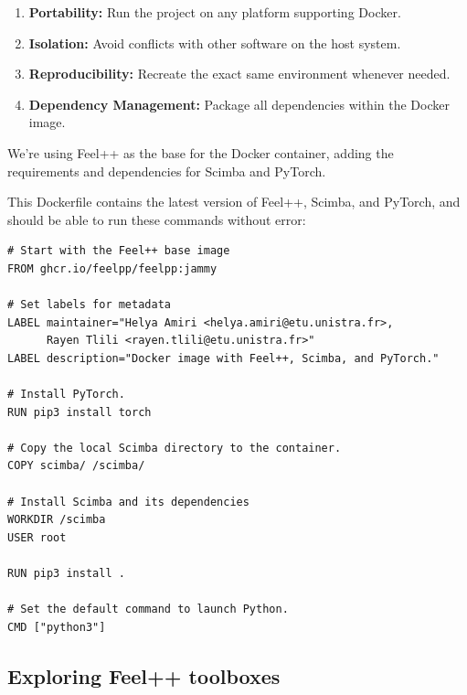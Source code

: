\documentclass[12pt]{article}
\begin{document}
\begin{enumerate}
    \item \textbf{Portability:} Run the project on any platform supporting Docker.
    \item \textbf{Isolation:} Avoid conflicts with other software on the host system.
    \item \textbf{Reproducibility:} Recreate the exact same environment whenever needed.
    \item \textbf{Dependency Management:} Package all dependencies within the Docker image.
    \\
\end{enumerate}


We're using Feel++ as the base for the Docker container, adding the requirements and dependencies for Scimba and PyTorch.

This Dockerfile contains the latest version of Feel++, Scimba, and PyTorch, and should be able to run these commands without error:
\\
\begin{lstlisting}[language=docker,caption={Dockerfile for Feel++, Scimba, and PyTorch},frame=single, backgroundcolor=\color{gray!10}, basicstyle=\footnotesize,rulecolor=\color{blue}, framexleftmargin=3pt, commentstyle=\color{mygreen}, keywordstyle=\color{blue}]
# Start with the Feel++ base image
FROM ghcr.io/feelpp/feelpp:jammy

# Set labels for metadata
LABEL maintainer="Helya Amiri <helya.amiri@etu.unistra.fr>,
      Rayen Tlili <rayen.tlili@etu.unistra.fr>"
LABEL description="Docker image with Feel++, Scimba, and PyTorch."

# Install PyTorch.
RUN pip3 install torch

# Copy the local Scimba directory to the container.
COPY scimba/ /scimba/

# Install Scimba and its dependencies
WORKDIR /scimba
USER root

RUN pip3 install .

# Set the default command to launch Python.
CMD ["python3"]
\end{lstlisting}


\newpage
\subsection{Exploring Feel++ toolboxes}
\end{document}
